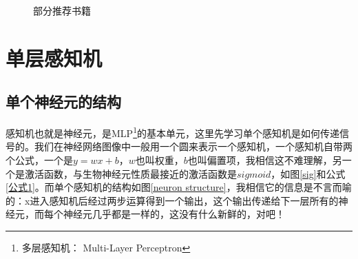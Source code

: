 \documentclass[a5paper, 11pt]{ctexbook}
\begin{document}
\begin{figure}[ht]
    \centering
    \caption{部分推荐书籍}
\end{figure}



\tableofcontents

\chapter{单层感知机} \label{单层感知机}

\section{单个神经元的结构}
感知机也就是神经元，是MLP\footnote{多层感知机： Multi-Layer Perceptron}的基本单元，这里先学习单个感知机是如何传递信号的。我们在神经网络图像中一般用一个圆来表示一个感知机，一个感知机自带两个公式，一个是$y=wx+b$，$w$也叫权重，$b$也叫偏置项，我相信这不难理解，另一个是激活函数，\label{为什么用sigmoid}与生物神经元性质最接近的激活函数是$sigmoid$，如图\ref{sig}和公式\ref{公式1}。而单个感知机的结构如图\ref{neuron structure}，我相信它的信息是不言而喻的：x进入感知机后经过两步运算得到一个输出，这个输出传递给下一层所有的神经元，而每个神经元几乎都是一样的，这没有什么新鲜的，对吧！
\end{document}
